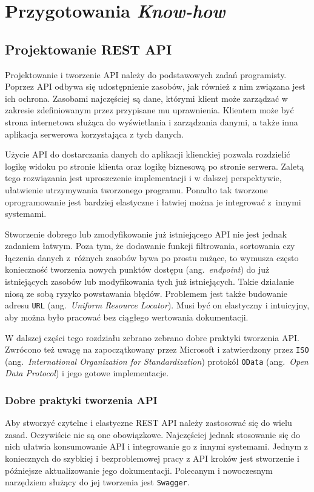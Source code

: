 \chapter{Przygotowania \emph{Know-how}}
\label{chap:know-how}
\section{Projektowanie REST API}
\label{sec:projektowanie-api}
Projektowanie i tworzenie API należy do podstawowych zadań programisty. Poprzez API odbywa się udostępnienie zasobów, jak również z nim związana jest ich ochrona. Zasobami najczęściej są dane, którymi klient może zarządzać w zakresie zdefiniowanym przez przypisane mu uprawnienia. Klientem może być strona internetowa służąca do wyświetlania i zarządzania danymi, a także inna aplikacja serwerowa korzystająca z tych danych.

Użycie API do dostarczania danych do aplikacji klienckiej pozwala rozdzielić logikę widoku po stronie klienta oraz logikę biznesową po stronie serwera. Zaletą tego rozwiązania jest uproszczenie implementacji i w dalszej perspektywie, ułatwienie utrzymywania tworzonego programu. Ponadto tak tworzone oprogramowanie jest bardziej elastyczne i łatwiej można je integrować z~innymi systemami. 

Stworzenie dobrego lub zmodyfikowanie już istniejącego API nie jest jednak zadaniem łatwym. Poza tym, że dodawanie funkcji filtrowania, sortowania czy łączenia danych z~różnych zasobów bywa po prostu nużące, to wymusza często konieczność tworzenia nowych punktów dostępu (ang.~\emph{endpoint}) do już istniejących zasobów lub modyfikowania tych już istniejących. Takie działanie niosą ze sobą ryzyko powstawania błędów. Problemem jest także budowanie adresu \texttt{URL} (ang.~\emph{Uniform Resource Locator}). Musi być on elastyczny i intuicyjny, aby można było pracować bez ciągłego wertowania dokumentacji. 

W dalszej części tego rozdziału zebrano zebrano dobre praktyki tworzenia API. Zwrócono też uwagę na zapoczątkowany przez Microsoft i zatwierdzony przez \texttt{ISO} (ang.~\emph{International Organization for Standardization}) protokół \texttt{OData} (ang.~\emph{Open Data Protocol}) i jego gotowe implementacje.

\subsection{Dobre praktyki tworzenia API} 
\label{subsec:api-dobre-praktyki}
Aby stworzyć czytelne i elastyczne REST API należy zastosować się do wielu zasad. Oczywiście nie są one obowiązkowe. Najczęściej jednak stosowanie się do nich ułatwia konsumowanie API i integrowanie go z innymi systemami. Jednym z koniecznych do szybkiej i bezproblemowej pracy z API kroków jest stworzenie i późniejsze aktualizowanie jego dokumentacji. Polecanym i nowoczesnym narzędziem służący do jej tworzenia jest \texttt{Swagger}. 

